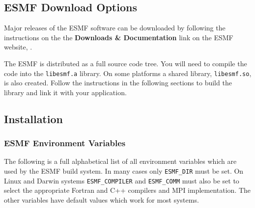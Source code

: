 
\subsection{ESMF Download Options}

Major releases of the ESMF software can be downloaded by following
the instructions on the 
the {\bf Downloads \& Documentation} link on the ESMF 
website, .

The ESMF is distributed as a full source code tree.  You will need
to compile the code into the {\tt libesmf.a} library.
On some platforms a shared library, {\tt libesmf.so}, is also created.
Follow the instructions in the following sections
to build the library and link it with your application.

\subsection{Installation}
\label{InstallProcedures}



\subsubsection{ESMF Environment Variables}
\label{EnvironmentVariables}

The following is a full alphabetical list of all environment variables which
are used by the ESMF build system. In many cases only {\tt ESMF\_DIR} must be 
set. On Linux and Darwin systems {\tt ESMF\_COMPILER} and {\tt ESMF\_COMM} must
also be set to select the appropriate Fortran and C++ compilers and MPI 
implementation. The other variables have default values which work for
most systems.

